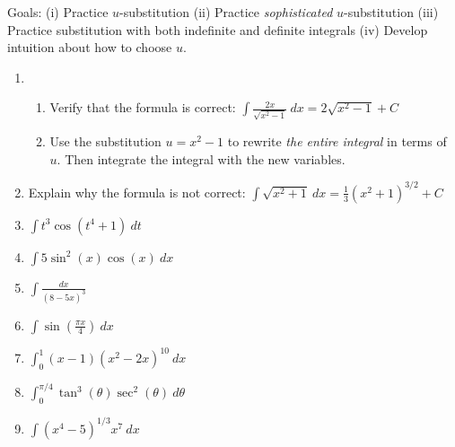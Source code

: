 \documentclass[11pt,fleqn]{article}
\begin{document}
\vspace*{-0.7in}

\begin{center}
  \Large{}
  \end{center}
 Goals: (i) Practice $u$-substitution (ii) Practice \emph{sophisticated} $u$-substitution (iii) Practice substitution with both indefinite and definite integrals (iv) Develop intuition about how to choose $u.$\\
\begin{enumerate}
\item \begin{enumerate}
	\item Verify that the formula is correct: $\displaystyle{\int \frac{2x}{\sqrt{x^2-1}} \: dx = 2\sqrt{x^2-1}+C}$
	\vfill
	\item Use the substitution $u=x^2-1$ to rewrite \emph{the entire integral} in terms of $u.$ Then integrate the integral with the new variables.
	\vfill
	\end{enumerate}
\item Explain why the formula is not correct: $\displaystyle{\int {\sqrt{x^2+1}} \: dx = \frac{1}{3}(x^2+1)^{3/2}+C}$
\vspace{1in}

\item $\displaystyle{\int t^3 \cos (t^4 +1)} \: dt$
\vfill
\item $\displaystyle{\int 5\sin^2(x) \cos(x)} \: dx$
\vfill
\newpage

\item $\displaystyle{\int \frac{dx}{(8-5x)^3}} $
\vfill
\item $\displaystyle{\int \sin\left(\frac{\pi x}{4}\right) \: dx}$
\vfill
\item $\displaystyle{\int_0^1 (x-1)(x^2-2x)^{10}} \: dx$
\vfill
\item $\displaystyle{\int_0^{\pi/4} \tan^3(\theta)\sec^2(\theta)} \: d\theta$
\vfill
\item $\displaystyle{\int (x^4 - 5)^{1/3} x^7 \: dx}$
\vfill

\end{enumerate}
\end{document}
